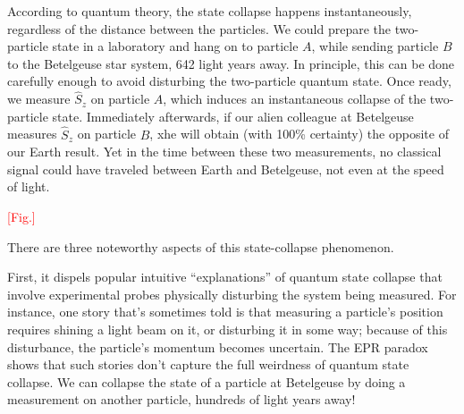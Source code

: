 \documentclass[pra,11pt]{revtex4}
\begin{document}
According to quantum theory, the state collapse happens
instantaneously, regardless of the distance between the particles.  We
could prepare the two-particle state in a laboratory and hang on to
particle $A$, while sending particle $B$ to the Betelgeuse star
system, 642 light years away.  In principle, this can be done
carefully enough to avoid disturbing the two-particle quantum state.
Once ready, we measure $\hat{S}_z$ on particle $A$, which induces an
instantaneous collapse of the two-particle state.  Immediately
afterwards, if our alien colleague at Betelgeuse measures $\hat{S}_z$
on particle $B$, xhe will obtain (with 100\% certainty) the opposite
of our Earth result.  Yet in the time between these two measurements,
no classical signal could have traveled between Earth and Betelgeuse,
not even at the speed of light.

\textcolor{red}{[Fig.]}

There are three noteworthy aspects of this state-collapse phenomenon.

First, it dispels popular intuitive ``explanations'' of quantum state
collapse that involve experimental probes physically disturbing the
system being measured.  For instance, one story that's sometimes told
is that measuring a particle's position requires shining a light beam
on it, or disturbing it in some way; because of this disturbance, the
particle's momentum becomes uncertain.  The EPR paradox shows that
such stories don't capture the full weirdness of quantum state
collapse.  We can collapse the state of a particle at Betelgeuse by
doing a measurement on another particle, hundreds of light years away!
\end{document}
